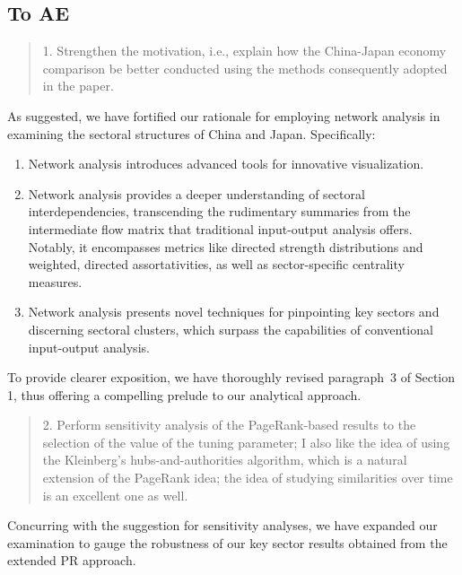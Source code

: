 \documentclass[12pt]{article}
\newcommand{\jy}[1]{\textcolor{red}{JY: #1}}
\newcommand{\tw}[1]{\textcolor{blue}{(TW: #1)}}
\newenvironment{comment}%
{\begin{quotation}\noindent\small\it\color{darkblue}\ignorespaces%
}{\end{quotation}}
\begin{document}
\subsection*{To AE}

\begin{comment}
1. Strengthen the motivation, i.e., explain how the China-Japan economy
comparison be better conducted using the methods consequently adopted in the
paper.
\end{comment}

As suggested, we have fortified our rationale for employing network analysis
in examining the sectoral structures of China and Japan. Specifically:
\begin{enumerate}
\item 
  Network analysis introduces advanced tools for innovative visualization.
\item
  Network analysis provides a deeper understanding of sectoral interdependencies,
  transcending the rudimentary summaries from the intermediate flow matrix that
  traditional input-output analysis offers. Notably, it encompasses metrics like
  directed strength distributions and weighted, directed assortativities, as well
  as sector-specific centrality measures.
\item
  Network analysis presents novel techniques for pinpointing key
  sectors and discerning sectoral clusters, which surpass the capabilities of
  conventional input-output analysis.
\end{enumerate}
To provide clearer exposition, we have thoroughly revised paragraph~3 of
Section 1, thus offering a compelling prelude to our analytical approach.



\begin{comment}
2. Perform sensitivity analysis of the PageRank-based results to the 
selection of the value of the tuning parameter; I also like the idea of using
the Kleinberg's hubs-and-authorities algorithm, which is a natural extension
of the PageRank idea; the idea of studying similarities over time is an
excellent one as well. 
\end{comment}

Concurring with the suggestion for sensitivity analyses, we have expanded our
examination to gauge the robustness of our key sector results obtained from the
extended PR approach.
\end{document}
